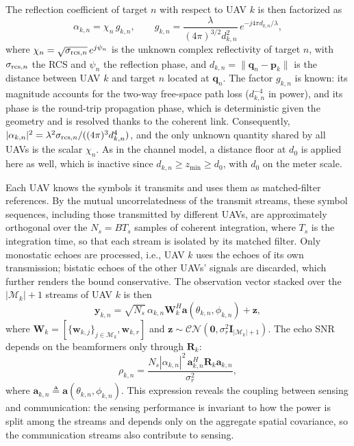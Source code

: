 \documentclass[conference]{IEEEtran}
\begin{document}
The reflection coefficient of target $n$ with respect to UAV $k$ is then factorized as
\begin{equation}
\alpha_{k,n}=\chi_n\,g_{k,n},\qquad
g_{k,n}=\frac{\lambda}{(4\pi)^{3/2}d_{k,n}^{2}}\,e^{-j4\pi d_{k,n}/\lambda},
\end{equation}
where $\chi_n=\sqrt{\sigma_{{\rm rcs},n}}\,e^{j\psi_n}$ is the unknown complex reflectivity of target $n$, with $\sigma_{{\rm rcs},n}$ the RCS and $\psi_n$ the reflection phase, and $d_{k,n}=\|\mathbf q_n-\mathbf p_k\|$ is the distance between UAV $k$ and target $n$ located at $\mathbf q_n$. The factor $g_{k,n}$ is known: its magnitude accounts for the two-way free-space path loss ($d_{k,n}^{-4}$ in power), and its phase is the round-trip propagation phase, which is deterministic given the geometry and is resolved thanks to the coherent link. Consequently, $|\alpha_{k,n}|^2=\lambda^2\sigma_{{\rm rcs},n}/((4\pi)^3d_{k,n}^4)$, and the only unknown quantity shared by all UAVs is the scalar $\chi_n$. As in the channel model, a distance floor at $d_0$ is applied here as well, which is inactive since $d_{k,n}\ge z_{\min}\ge d_0$, with $d_0$ on the meter scale.

Each UAV knows the symbols it transmits and uses them as matched-filter references. By the mutual uncorrelatedness of the transmit streams, these symbol sequences, including those transmitted by different UAVs, are approximately orthogonal over the $N_s=BT_s$ samples of coherent integration, where $T_s$ is the integration time, so that each stream is isolated by its matched filter. Only monostatic echoes are processed, i.e., UAV $k$ uses the echoes of its own transmission; bistatic echoes of the other UAVs' signals are discarded, which further renders the bound conservative. The observation vector stacked over the $|\mathcal M_k|+1$ streams of UAV $k$ is then
\begin{equation}\label{eq:obs}
\mathbf y_{k,n}=\sqrt{N_s}\,\alpha_{k,n}\mathbf W_k^H\mathbf a(\theta_{k,n},\phi_{k,n})+\mathbf z,
\end{equation}
where $\mathbf W_k=[\{\mathbf w_{k,j}\}_{j\in\mathcal M_k},\mathbf w_{k,r}]$ and $\mathbf z\sim\mathcal{CN}(\mathbf 0,\sigma_r^2\mathbf I_{|\mathcal M_k|+1})$. The echo SNR depends on the beamformers only through $\mathbf R_k$:
\begin{equation}\label{eq:echo_snr}
\rho_{k,n}=\frac{N_s|\alpha_{k,n}|^2\,\mathbf a_{k,n}^H\mathbf R_k\mathbf a_{k,n}}{\sigma_r^2},
\end{equation}
where $\mathbf a_{k,n}\triangleq\mathbf a(\theta_{k,n},\phi_{k,n})$. This expression reveals the coupling between sensing and communication: the sensing performance is invariant to how the power is split among the streams and depends only on the aggregate spatial covariance, so the communication streams also contribute to sensing.
\end{document}
